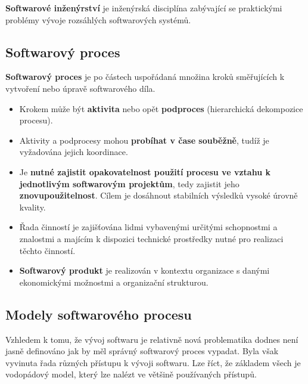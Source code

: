 \textbf{Softwarové inženýrství} je inženýrská disciplína zabývající se praktickými problémy vývoje
rozsáhlých softwarových systémů.

\subsection{Softwarový proces}
\textbf{Softwarový proces} je po částech uspořádaná množina kroků směřujících k vytvoření nebo úpravě softwarového díla.
\begin{itemize}
\item Krokem může být \textbf{aktivita} nebo opět \textbf{podproces} (hierarchická dekompozice procesu). 
\item Aktivity a podprocesy mohou \textbf{probíhat v čase souběžně}, tudíž je vyžadována jejich koordinace. 
\item Je \textbf{nutné zajistit opakovatelnost použití procesu ve vztahu k jednotlivým softwarovým projektům}, tedy zajistit jeho \textbf{znovupoužitelnost}.  Cílem je dosáhnout stabilních výsledků vysoké úrovně kvality.
\item Řada činností je zajišťována lidmi vybavenými určitými schopnostmi a znalostmi a majícím k dispozici technické prostředky nutné pro realizaci těchto činností.
\item \textbf{Softwarový produkt} je realizován v kontextu organizace s danými ekonomickými možnostmi a organizační strukturou.
\end{itemize}

\subsection{Modely softwarového procesu}
Vzhledem k tomu, že vývoj softwaru je relativně nová problematika dodnes není jasně definováno jak by měl správný softwarový proces vypadat. Byla však vyvinuta řada různých přístupu k vývoji softwaru. Lze říct, že základem všech je vodopádový model, který lze nalézt ve většině používaných přístupů.


